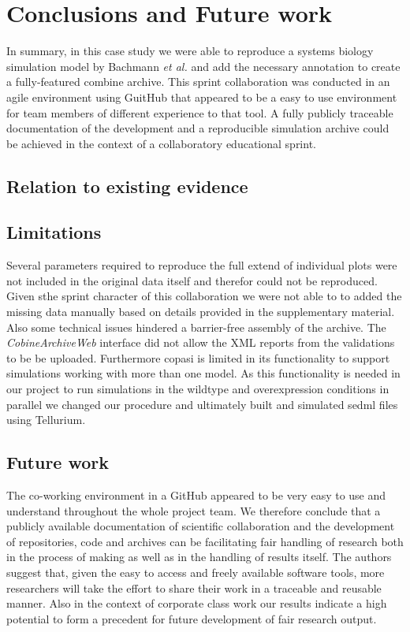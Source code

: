 \section*{Conclusions and Future work}

In summary, in this case study we were able to reproduce a systems biology simulation model by Bachmann \textit{et al.} \cite{bachmannmodel} and add the necessary annotation to create a fully-featured \ac{combine} archive. This sprint collaboration was conducted in an agile environment using GuitHub that appeared to be a easy to use environment for team members of different experience to that tool. A fully publicly traceable documentation of the development and a reproducible simulation archive could be achieved in the context of a collaboratory educational sprint.

\subsection*{Relation to existing evidence}

\subsection*{Limitations}
Several parameters required to reproduce the full extend of individual plots were not included in the original data itself and therefor could not be reproduced.  Given sthe sprint character of this collaboration we were not able to to added the missing data manually based on details provided in the supplementary material. 
Also some technical issues hindered a barrier-free assembly of the archive. The \textit{CobineArchiveWeb} interface did not allow the XML reports from the validations to be be uploaded. Furthermore \ac{copasi} is limited in its functionality to support simulations working with more than one model. As this functionality is needed in our project to run simulations in the wildtype and overexpression conditions in parallel we changed our procedure and ultimately built and simulated \ac{sedml} files using Tellurium.


\subsection*{Future work}
The co-working environment in a GitHub appeared to be very easy to use and understand throughout the whole project team. We therefore conclude that a publicly available documentation of scientific collaboration and the development of repositories, code and archives can be facilitating \ac{fair} handling of research both in the process of making as well as in the handling of results itself.
The authors suggest that, given the easy to access and freely available software tools, more researchers will take the effort to share their work in a traceable and reusable manner. Also in the context of corporate class work our results indicate a high potential to form a precedent for future development of \ac{fair} research output.
\pagebreak